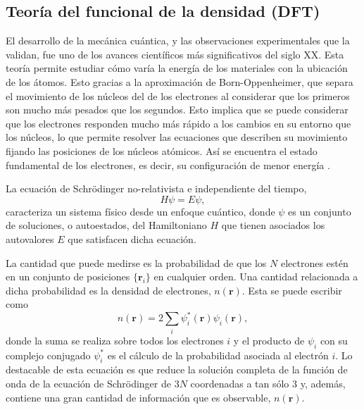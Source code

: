 \subsection{Teoría del funcional de la densidad (DFT)}

El desarrollo de la mecánica cuántica, y las observaciones experimentales que la
validan, fue uno de los avances científicos más significativos del siglo XX. 
Esta teoría permite estudiar cómo varía la energía de los materiales con la
ubicación de los átomos. Esto gracias a la aproximación de Born-Oppenheimer, que 
separa el movimiento de los núcleos del de los electrones al considerar que los primeros son mucho más
pesados que los segundos. Esto implica que se puede considerar que los electrones 
responden mucho más rápido a los cambios en su entorno que los núcleos, lo que 
permite resolver las ecuaciones que describen su movimiento fijando las 
posiciones de los núcleos atómicos. Así se encuentra el estado fundamental de los
electrones, es decir, su configuración de menor energía \cite{shankar2012}.

La ecuación de Schrödinger no-relativista e independiente del tiempo,
\begin{equation}\label{eq:schrodinger}
    H \psi = E \psi,
\end{equation}
caracteriza un sistema físico desde un enfoque cuántico, donde $\psi$ es un
conjunto de soluciones, o autoestados, del Hamiltoniano $H$ que tienen asociados los
autovalores $E$ que satisfacen dicha ecuación. 

La cantidad que puede medirse es la probabilidad de que los $N$ electrones 
estén en un conjunto de posiciones $\lbrace \mathbf{r}_i \rbrace$ en cualquier orden. 
Una cantidad relacionada a dicha probabilidad es la densidad de electrones,
$n(\mathbf{r})$. Esta se puede escribir como 
\begin{equation}
    n(\mathbf{r}) = 2 \sum_i \psi_i^*(\mathbf{r}) \psi_i(\mathbf{r}),
\end{equation}
donde la suma se realiza sobre todos los electrones $i$ y el producto de $\psi_i$ con su 
complejo conjugado $\psi_i^*$ es el cálculo de la probabilidad asociada al electrón $i$. 
Lo destacable de esta ecuación es que reduce la solución completa de la función de onda
de la ecuación de Schrödinger de $3 N$ coordenadas a tan sólo 3 y, además, contiene una 
gran cantidad de información que es observable, $n(\mathbf{r})$.

